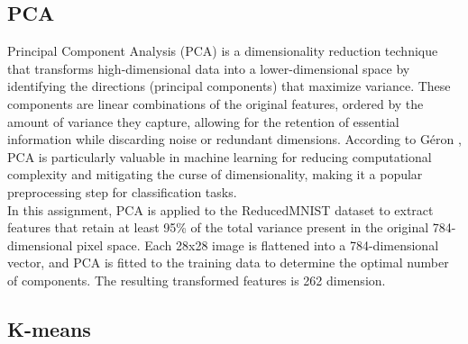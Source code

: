 \documentclass[12pt]{article}
\begin{document}
\subsection{PCA}
Principal Component Analysis (PCA) is a dimensionality reduction technique that transforms high-dimensional data into a lower-dimensional space by identifying the directions (principal components) that maximize variance. These components are linear combinations of the original features, ordered by the amount of variance they capture, allowing for the retention of essential information while discarding noise or redundant dimensions. According to Géron \cite{geron2019}, PCA is particularly valuable in machine learning for reducing computational complexity and mitigating the curse of dimensionality, making it a popular preprocessing step for classification tasks.\\
In this assignment, PCA is applied to the ReducedMNIST dataset to extract features that retain at least 95\% of the total variance present in the original 784-dimensional pixel space. Each 28x28 image is flattened into a 784-dimensional vector, and PCA is fitted to the training data to determine the optimal number of components. The resulting transformed features is 262 dimension.


\subsection{K-means}
\end{document}
